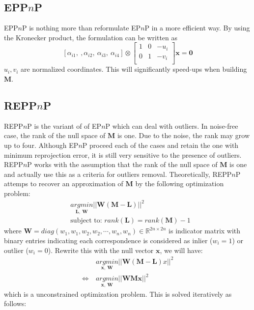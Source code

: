 \documentclass[a4paper]{report}
\begin{document}
\subsection{EPP$n$P}
EPP$n$P is nothing more than reformulate EP$n$P in a more efficient way. By using the Kronecker product, the formulation can be written as
$$
\left[\alpha_{i1},\ ,\alpha_{i2},\ \alpha_{i3},\ \alpha_{i4}\right] \otimes 
\left[
\begin{matrix}
1 & 0 & -u_i \\
0 & 1 & -v_i \\
\end{matrix}
\right]\mathbf{x}=\mathbf{0}
$$
$u_i, v_i$ are normalized coordinates. This will significantly speed-ups when building $\mathbf{M}$.

\subsection{REPP$n$P}
REPP$n$P is the variant of of EP$n$P which can deal with outliers. In noise-free case, the rank of the null space of $\mathbf{M}$ is one. Due to the noise, the rank may grow up to four. Although EP$n$P proceed each of the cases and retain the one with minimum reprojection error, it is still very sensitive to the presence of outliers. REPP$n$P works with the assumption that the rank of the null space of $\mathbf{M}$ is one and actually use this as a criteria for outliers removal. Theoretically, REPP$n$P attemps to recover an approximation of $\mathbf{M}$ by the following optimization problem:
\begin{align*}
&\underset{\mathbf{L},\ \mathbf{W}}{argmin} ||\mathbf{W}(\mathbf{M-L})||^2 \\
&\text{subject to: } rank(\mathbf{L})=rank(\mathbf{M})-1
\end{align*}
where $\mathbf{W}=diag(w_1,w_1,w_2,w_2,\cdots,w_n,w_n) \in \mathbb{R}^{2n\times 2n}$ is indicator matrix with binary entries indicating each correspondence is considered as inlier ($w_i=1$) or outlier ($w_i=0$). Rewrite this with the null vector $\mathbf{x}$, we will have:
\begin{align*}
&\underset{\mathbf{x},\ \mathbf{W}}{argmin} ||\mathbf{W}(\mathbf{M-L})x||^2 \\ \Leftrightarrow\ &\underset{\mathbf{x},\ \mathbf{W}}{argmin} ||\mathbf{W}\mathbf{Mx}||^2
\end{align*}
which is a unconstrained optimization problem. This is solved iteratively as follows:
\end{document}
